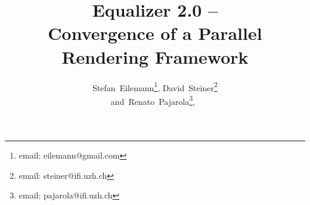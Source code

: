 \documentclass[10pt,journal,compsoc]{IEEEtran}
\begin{document}
%
\title{Equalizer 2.0 --\\Convergence of a Parallel Rendering Framework}
%
%
%
%

\author{Stefan~Eilemann\thanks{email: eilemann@gmail.com},
        David~Steiner\thanks{email: steiner@ifi.uzh.ch} \\ %
        and~Renato~Pajarola\thanks{email: pajarola@ifi.uzh.ch},~%
}


\end{document}
